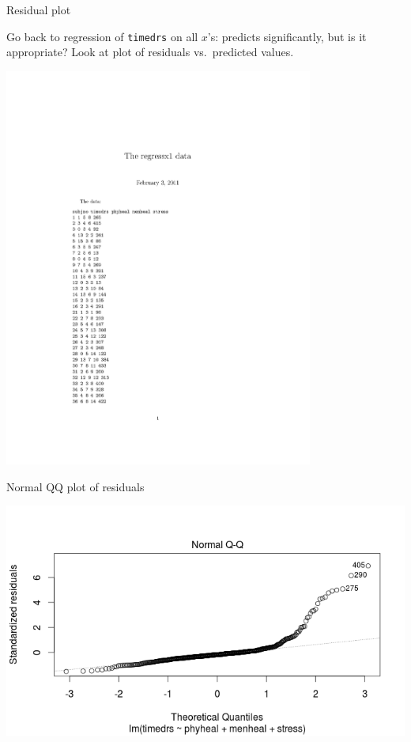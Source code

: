 \begin{frame}[fragile]{Residual plot}


Go back to regression of \verb-timedrs- on all $x$'s: predicts significantly, but is it appropriate? Look at plot of residuals vs.\ predicted values.


\includegraphics[width=4in]{regressx1}

\end{frame}

\begin{frame}[fragile]{Normal QQ plot of residuals}

\includegraphics[width=\textwidth]{regressx1a}
  
\end{frame}

